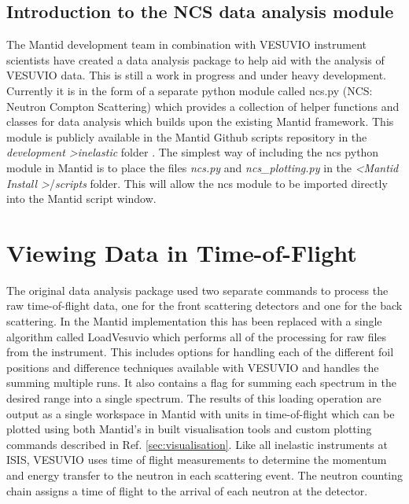 \documentclass[paper=a4, fontsize=11pt]{scrartcl}	%
\numberwithin{equation}{section}															%
\numberwithin{figure}{section}																%
\numberwithin{table}{section}
\begin{document}
\subsection{Introduction to the NCS data analysis module}
\label{subsec:intro-data-analysis}
The Mantid development team in combination with VESUVIO instrument scientists have created a data analysis package to help aid with the analysis of VESUVIO data. This is still a work in progress and under heavy development. Currently it is in the form of a separate python module called ncs.py (NCS: Neutron Compton Scattering) which provides a collection of helper functions and classes for data analysis which builds upon the existing Mantid framework. This module is publicly available in the Mantid Github scripts repository in the \textit{development \textgreater  inelastic} folder \cite{mantidgithubncs}. The simplest way of including the ncs python module in Mantid is to place the files \textit{ncs.py} and \textit{ncs\_plotting.py} in the \textit{ \textless Mantid Install \textgreater }/\textit{scripts} folder. This will allow the ncs module to be imported directly into the Mantid script window.

\section{Viewing Data in Time-of-Flight}
\label{sec:viewtof}
The original data analysis package \cite{mayers2010user} used two separate commands to process the raw time-of-flight data, one for the front scattering detectors and one for the back scattering. In the Mantid implementation this has been replaced with a single algorithm called LoadVesuvio which performs all of the processing for raw files from the instrument. This includes options for handling each of the different foil positions and difference techniques available with VESUVIO \citep{schooneveld2006foil, mayers2004vesuvio} and handles the summing multiple runs. It also contains a flag for summing each spectrum in the desired range into a single spectrum. The results of this loading operation are output as a single workspace in Mantid with units in time-of-flight which can be plotted using both Mantid's in built visualisation tools and custom plotting commands described in Ref. \ref{sec:visualisation}. Like all inelastic instruments at ISIS, VESUVIO uses time of flight measurements to determine the momentum and energy transfer to the neutron in each scattering event. The neutron counting chain assigns a time of flight to the arrival of each neutron at the detector.
\end{document}

